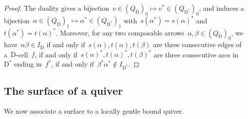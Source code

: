 \documentclass{amsart}
\theoremstyle{definition}
\newcommand{\dual}{^*} %
\newcommand{\dissection}{\mathrm{D}} %
\begin{document}
\begin{proof}
 The duality gives a bijection~$v\in (Q_\dissection)_0\mapsto v\dual\in (Q_{\dissection\dual})_0$, and induces a bijection~$\alpha\in (Q_\dissection)_1\mapsto \alpha\dual\in (Q_{\dissection\dual})_1$ with~$s(\alpha\dual)=s(\alpha)\dual$ and~$t(\alpha\dual)=t(\alpha)\dual$.
 Moreover, for any two composable arrows~$\alpha,\beta\in(Q_\dissection)_0$, we have~$\alpha\beta\in I_\dissection$ if and only if~$s(\alpha),t(\alpha),t(\beta)$ are three consecutive edges of a~$\dissection$-cell~$f$, if and only if~$s(\alpha)\dual,t(\alpha)\dual,t(\beta)\dual$ are three consecutive arcs in~$\dissection\dual$ ending in~$f\dual$, if and only if~$\beta\dual\alpha\dual\notin I_{\dissection\dual}$.
\end{proof}


\subsection{The surface of a quiver}

We now associate a surface to a locally gentle bound quiver.
\end{document}
